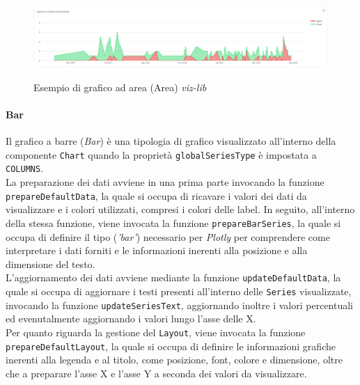 \begin{figure}[H]
    \centering
    \includegraphics[alt={Esempio di grafico ad area viz-lib}, width=1 \columnwidth, height=\maxdimen, keepaspectratio]{img/ex_area.png}
    \caption{Esempio di grafico ad area (Area) \textit{viz-lib}}
    \label{fig:area-example}
\end{figure}

\paragraph{Bar}
Il grafico a barre (\textit{Bar}) è una tipologia di grafico visualizzato all'interno della componente \texttt{Chart} quando la proprietà \texttt{globalSeriesType} è impostata a \texttt{COLUMNS}. \\
La preparazione dei dati avviene in una prima parte invocando la funzione \texttt{prepareDefaultData}, la quale si occupa di ricavare i valori dei dati da visualizzare e i colori utilizzati, compresi i
colori delle label. In seguito, all'interno della stessa funzione, viene invocata la funzione \texttt{prepareBarSeries}, la quale si occupa di definire il tipo (\textit{'bar'}) necessario per \textit{Plotly} per comprendere
come interpretare i dati forniti e le informazioni inerenti alla posizione e alla dimensione del testo. \\
L'aggiornamento dei dati avviene mediante la funzione \texttt{updateDefaultData}, la quale si occupa di aggiornare i testi presenti all'interno delle \texttt{Series} visualizzate, invocando la funzione
\texttt{updateSeriesText}, aggiornando inoltre i valori percentuali ed evenutalmente aggiornando i valori lungo l'asse delle X. \\
Per quanto riguarda la gestione del \texttt{Layout}, viene invocata la funzione \texttt{prepareDefaultLayout}, la quale si occupa di definire le informazioni grafiche inerenti alla legenda e al titolo, come posizione,
font, colore e dimensione, oltre che a preparare l'asse X e l'asse Y a seconda dei valori da visualizzare.

